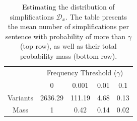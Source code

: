 \documentclass[a4paper, 11pt]{article}
\begin{document}



\begin{table}[t]
	\vspace{-0.5cm}
	\centering
	\small
	\singlespacing
	\begin{tabular}{c|c|c|c|c|}
		& \multicolumn{4}{c|}{Frequency Threshold ($\gamma$)}\\ 
		& \multicolumn{1}{c}{0} & \multicolumn{1}{c}{0.001} & \multicolumn{1}{c}{0.01} & \multicolumn{1}{c|}{0.1}
		\\
		\hline
		Variants & 2636.29 & 111.19 & 4.68 & 0.13
		\\
		Mass & 1 & 0.42 & 0.14 & 0.02\\
		\hline
	\end{tabular}
	\caption{\label{tab:simplifications_dist}
		Estimating the distribution of simplifications $\mathcal{D}_x$.
		The table presents the mean number of simplifications per sentence with probability of more than
		$\gamma$ (top row), as well as their total probability mass (bottom row).
	}
	\vspace{-0.5cm}
\end{table}
\end{document}
